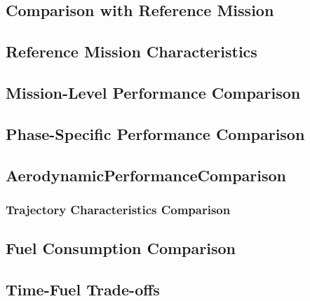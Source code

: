 \documentclass[12pt, a4paper]{report}
\begin{document}
\subsection{Comparison with Reference Mission}



\subsection{Reference Mission Characteristics}


\subsection{Mission-Level Performance Comparison}


\subsection{Phase-Specific Performance Comparison}


\subsection{AerodynamicPerformanceComparison}




\subsubsection{Trajectory Characteristics Comparison}



\subsection{Fuel Consumption Comparison}





\subsection{Time-Fuel Trade-offs}

\end{document}
